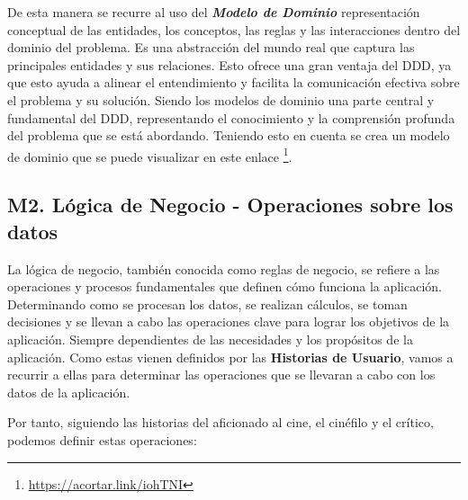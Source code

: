 De esta manera se recurre al uso del \textit{\textbf{Modelo de Dominio}} representación conceptual de las entidades, los conceptos, las reglas y las interacciones dentro del dominio del problema. Es una abstracción del mundo real que captura las principales entidades y sus relaciones. Esto ofrece una gran ventaja del DDD, ya que esto ayuda a alinear el entendimiento y facilita la comunicación efectiva sobre el problema y su solución. Siendo los modelos de dominio una parte central y fundamental del DDD, representando el conocimiento y la comprensión profunda del problema que se está abordando. Teniendo esto en cuenta se crea un modelo de dominio que se puede visualizar en este enlace \footnote{\url{https://acortar.link/iohTNI}}.

\subsection{M2. Lógica de Negocio - Operaciones sobre los datos}

La lógica de negocio, también conocida como reglas de negocio, se refiere a las operaciones y procesos fundamentales que definen cómo funciona la aplicación. Determinando como se procesan los datos, se realizan cálculos, se toman decisiones y se llevan a cabo las operaciones clave para lograr los objetivos de la aplicación. Siempre dependientes de las necesidades y los propósitos de la aplicación. Como estas vienen definidos por las \textbf{Historias de Usuario}, vamos a recurrir a ellas para determinar las operaciones que se llevaran a cabo con los datos de la aplicación. 

Por tanto, siguiendo las historias del aficionado al cine, el cinéfilo y el crítico, podemos definir estas operaciones:


